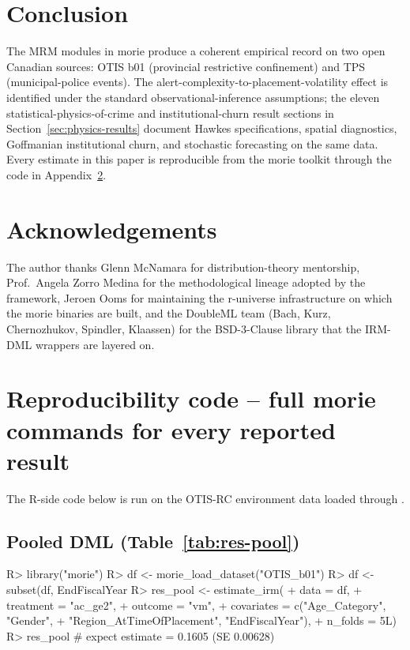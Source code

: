 \documentclass[article,shortnames,nojss]{jss}
\newcommand{\OTIS}{\textsf{OTIS}}
\newcommand{\TPS}{\textsf{TPS}}
\begin{document}
\section{Conclusion}
\label{sec:conclusion}

The MRM modules in morie produce a coherent empirical record on
two open Canadian sources: \OTIS{} b01 (provincial restrictive
confinement) and \TPS{} (municipal-police events). The
alert-complexity-to-placement-volatility effect is identified under
the standard observational-inference assumptions; the eleven
statistical-physics-of-crime and institutional-churn result sections
in Section~\ref{sec:physics-results} document Hawkes specifications,
spatial diagnostics, Goffmanian institutional churn, and stochastic
forecasting on the same data. Every
estimate in this paper is reproducible from the morie toolkit
through the code in Appendix~\ref{app:reproducibility}.

\section*{Acknowledgements}

The author thanks Glenn McNamara for distribution-theory mentorship,
Prof.~Angela Zorro Medina for the methodological lineage adopted by
the framework, Jeroen Ooms for maintaining the r-universe
infrastructure on which the morie binaries are built, and the
DoubleML team (Bach, Kurz, Chernozhukov, Spindler, Klaassen) for
the BSD-3-Clause library that the IRM-DML wrappers are layered on.

\appendix

\section{Reproducibility code -- full morie commands for every reported result}
\label{app:reproducibility}

The R-side code below is run on the OTIS-RC environment data loaded
through .

\subsection[Pooled DML]{Pooled DML (Table~\ref{tab:res-pool})}

\begin{Code}
R> library("morie")
R> df  <- morie_load_dataset("OTIS_b01")
R> df  <- subset(df, EndFiscalYear %
R> res_pool <- estimate_irm(
+    data       = df,
+    treatment  = "ac_ge2",
+    outcome    = "vm",
+    covariates = c("Age_Category", "Gender",
+                   "Region_AtTimeOfPlacement", "EndFiscalYear"),
+    n_folds    = 5L)
R> res_pool   # expect estimate = 0.1605 (SE 0.00628)
\end{Code}
\end{document}
